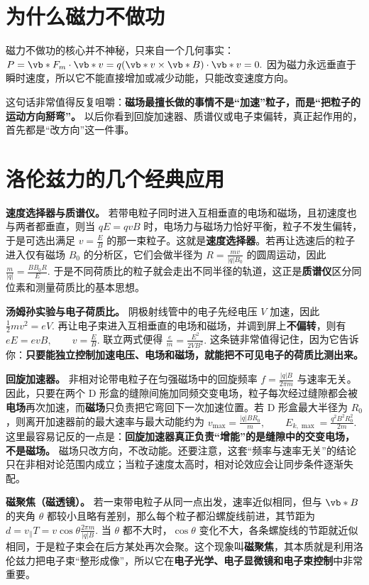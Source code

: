 \documentclass[lang=cn,11pt]{elegantbook}
\newcommand{\bridge}[1]{\begin{note}#1\end{note}}
\begin{document}
\section{为什么磁力不做功}

磁力不做功的核心并不神秘，只来自一个几何事实：
 \(P=\vb*{F}_m\cdot \vb*{v} =q(\vb*{v}\times \vb*{B})\cdot \vb*{v}=0.\) 
因为磁力永远垂直于瞬时速度，所以它不能直接增加或减少动能，只能改变速度方向。

\bridge{这句话非常值得反复咀嚼：\textbf{磁场最擅长做的事情不是“加速”粒子，而是“把粒子的运动方向掰弯”。} 以后你看到回旋加速器、质谱仪或电子束偏转，真正起作用的，首先都是“改方向”这一件事。}

\section{洛伦兹力的几个经典应用}

\textbf{速度选择器与质谱仪。} 若带电粒子同时进入互相垂直的电场和磁场，且初速度也与两者都垂直，则当
 \(qE=qvB\) 
时，电场力与磁场力恰好平衡，粒子不发生偏转，于是可选出满足
 \(v=\frac{E}{B}\) 
的那一束粒子。这就是\textbf{速度选择器}。若再让选速后的粒子进入仅有磁场 \(B_0\) 的分析区，它们会做半径为
 \(R=\frac{mv}{|q|B_0}\) 
的圆周运动，因此
 \(\frac{m}{|q|}=\frac{BB_0R}{E}.\) 
于是不同荷质比的粒子就会走出不同半径的轨道，这正是\textbf{质谱仪}区分同位素和测量荷质比的基本思想。

\textbf{汤姆孙实验与电子荷质比。} 阴极射线管中的电子先经电压 \(V\) 加速，因此
 \(\frac12 mv^2=eV.\) 
再让电子束进入互相垂直的电场和磁场，并调到屏上\textbf{不偏转}，则有
 \(eE=evB, \qquad v=\frac{E}{B}.\) 
联立两式便得
 \(\frac{e}{m}=\frac{E^2}{2VB^2}.\) 
这条链非常值得记住，因为它告诉你：\textbf{只要能独立控制加速电压、电场和磁场，就能把不可见电子的荷质比测出来。}

\textbf{回旋加速器。} 非相对论带电粒子在匀强磁场中的回旋频率
 \(f=\frac{|q|B}{2\pi m}\) 
与速率无关。因此，只要在两个 D 形盒的缝隙间施加同频交变电场，粒子每次经过缝隙都会被\textbf{电场}再次加速，而\textbf{磁场}只负责把它弯回下一次加速位置。若 D 形盒最大半径为 \(R_0\)，则离开加速器前的最大速率与最大动能约为
 \(v_{\max}=\frac{|q|BR_0}{m}, \qquad E_{k,\max}=\frac{q^2B^2R_0^2}{2m}.\) 
这里最容易记反的一点是：\textbf{回旋加速器真正负责“增能”的是缝隙中的交变电场，不是磁场。} 磁场只改方向，不改动能。还要注意，这套“频率与速率无关”的结论只在非相对论范围内成立；当粒子速度太高时，相对论效应会让同步条件逐渐失配。

\textbf{磁聚焦（磁透镜）。} 若一束带电粒子从同一点出发，速率近似相同，但与 \(\vb*{B}\) 的夹角 \(\theta\) 都较小且略有差别，那么每个粒子都沿螺旋线前进，其节距为
 \(d=v_\parallel T =v\cos\theta\frac{2\pi m}{|q|B}.\) 
当 \(\theta\) 都不大时，\(\cos\theta\) 变化不大，各条螺旋线的节距就近似相同，于是粒子束会在后方某处再次会聚。这个现象叫\textbf{磁聚焦}，其本质就是利用洛伦兹力把电子束“整形成像”，所以它在\textbf{电子光学、电子显微镜和电子束控制}中非常重要。
\end{document}
